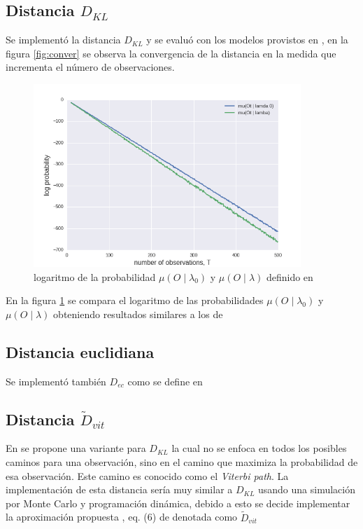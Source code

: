 \documentclass[a4paper]{article}
\begin{document}
\subsection{Distancia $D_{KL}$}

Se implementó la distancia $D_{KL}$ y se evaluó con los modelos
provistos en \cite{1985}, en la figura \ref{fig:conver} se observa la
convergencia de la distancia en la medida que incrementa el
número de observaciones.

\begin{figure}
  \centering
  \includegraphics[width=0.9\textwidth]{./img/log_prob3.png}
  \caption{\label{fig:logprob} logaritmo de la probabilidad $\mu(O \mid \lambda_0)$ y  $\mu(O \mid \lambda)$ definido en \cite{1985}}
\end{figure}

En la figura \ref{fig:logprob} se compara el logaritmo de las
probabilidades  $\mu(O \mid \lambda_0)$ y $\mu(O \mid \lambda)$
obteniendo resultados similares a los de \cite{1985}

\subsection{Distancia euclidiana}

Se implementó también $D_{ec}$ como se define en \cite{1995calculation}

\subsection{Distancia $\widetilde{D}_{vit}$}

En \cite{1995calculation} se propone una variante para $D_{KL}$ la
cual no se enfoca en todos los posibles caminos para una observación,
sino en el camino que maximiza la probabilidad de esa observación. Este
camino es conocido como el \textit{Viterbi path}. La implementación
de esta distancia sería muy similar a $D_{KL}$ usando una simulación
por Monte Carlo y programación dinámica, debido a esto se decide
implementar la aproximación propuesta , eq. (6) de
\cite{1995calculation} denotada como $\widetilde{D}_{vit}$
\end{document}
